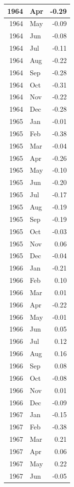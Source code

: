 \documentclass[
]{article}
\begin{document}
\begin{table}[H]
\begin{tabular}[t]{r|l|r}
\hline
1964 & Apr & -0.29\\
\hline
1964 & May & -0.09\\
\hline
1964 & Jun & -0.08\\
\hline
1964 & Jul & -0.11\\
\hline
1964 & Aug & -0.22\\
\hline
1964 & Sep & -0.28\\
\hline
1964 & Oct & -0.31\\
\hline
1964 & Nov & -0.22\\
\hline
1964 & Dec & -0.28\\
\hline
1965 & Jan & -0.01\\
\hline
1965 & Feb & -0.38\\
\hline
1965 & Mar & -0.04\\
\hline
1965 & Apr & -0.26\\
\hline
1965 & May & -0.10\\
\hline
1965 & Jun & -0.20\\
\hline
1965 & Jul & -0.17\\
\hline
1965 & Aug & -0.19\\
\hline
1965 & Sep & -0.19\\
\hline
1965 & Oct & -0.03\\
\hline
1965 & Nov & 0.06\\
\hline
1965 & Dec & -0.04\\
\hline
1966 & Jan & -0.21\\
\hline
1966 & Feb & 0.10\\
\hline
1966 & Mar & 0.01\\
\hline
1966 & Apr & -0.22\\
\hline
1966 & May & -0.01\\
\hline
1966 & Jun & 0.05\\
\hline
1966 & Jul & 0.12\\
\hline
1966 & Aug & 0.16\\
\hline
1966 & Sep & 0.08\\
\hline
1966 & Oct & -0.08\\
\hline
1966 & Nov & 0.01\\
\hline
1966 & Dec & -0.09\\
\hline
1967 & Jan & -0.15\\
\hline
1967 & Feb & -0.38\\
\hline
1967 & Mar & 0.21\\
\hline
1967 & Apr & 0.06\\
\hline
1967 & May & 0.22\\
\hline
1967 & Jun & -0.05\\

\end{tabular}
\end{table}
\end{document}
